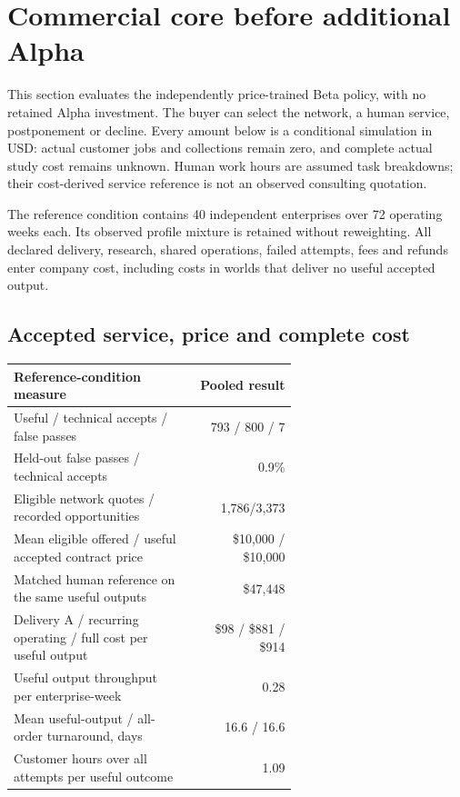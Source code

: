 \section{Commercial core before additional Alpha}\label{sec:commercial-core-results}

This section evaluates the independently price-trained Beta policy, with no retained Alpha investment. The buyer can select the network, a human service, postponement or decline. Every amount below is a conditional simulation in USD: actual customer jobs and collections remain zero, and complete actual study cost remains unknown. Human work hours are assumed task breakdowns; their cost-derived service reference is not an observed consulting quotation.

The reference condition contains 40 independent enterprises over 72 operating weeks each. Its observed profile mixture is retained without reweighting. All declared delivery, research, shared operations, failed attempts, fees and refunds enter company cost, including costs in worlds that deliver no useful accepted output.

\subsection{Accepted service, price and complete cost}

{\small
\setlength{\tabcolsep}{4pt}
\begin{tabular}{@{}p{0.62\linewidth}r@{}}
\toprule
Reference-condition measure & Pooled result \\
\midrule
Useful / technical accepts / false passes & 793 / 800 / 7 \\
Held-out false passes / technical accepts & 0.9\% \\
Eligible network quotes / recorded opportunities & 1,786/3,373 \\
Mean eligible offered / useful accepted contract price & \$10,000 / \$10,000 \\
Matched human reference on the same useful outputs & \$47,448 \\
Delivery A / recurring operating / full cost per useful output & \$98 / \$881 / \$914 \\
Useful output throughput per enterprise-week & 0.28 \\
Mean useful-output / all-order turnaround, days & 16.6 / 16.6 \\
Customer hours over all attempts per useful outcome & 1.09 \\
\bottomrule
\end{tabular}
}

